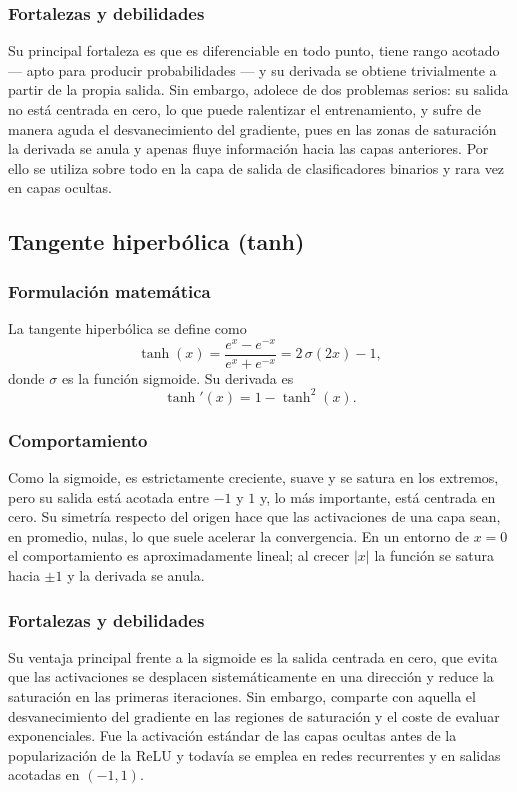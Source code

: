 \documentclass[12pt,a4paper]{article}
\begin{document}
\subsubsection{Fortalezas y debilidades}
Su principal fortaleza es que es diferenciable en todo punto, tiene rango acotado --- apto para producir probabilidades --- y su derivada se obtiene trivialmente a partir de la propia salida. Sin embargo, adolece de dos problemas serios: su salida no está centrada en cero, lo que puede ralentizar el entrenamiento, y sufre de manera aguda el desvanecimiento del gradiente, pues en las zonas de saturación la derivada se anula y apenas fluye información hacia las capas anteriores. Por ello se utiliza sobre todo en la capa de salida de clasificadores binarios y rara vez en capas ocultas.

\subsection{Tangente hiperbólica (tanh)}

\subsubsection{Formulación matemática}
La tangente hiperbólica se define como
\begin{equation*}
\tanh(x) = \frac{e^{x} - e^{-x}}{e^{x} + e^{-x}} = 2\,\sigma(2x) - 1,
\end{equation*}
donde $\sigma$ es la función sigmoide. Su derivada es
\begin{equation*}
\tanh'(x) = 1 - \tanh^2(x).
\end{equation*}

\subsubsection{Comportamiento}
Como la sigmoide, es estrictamente creciente, suave y se satura en los extremos, pero su salida está acotada entre $-1$ y $1$ y, lo más importante, está centrada en cero. Su simetría respecto del origen hace que las activaciones de una capa sean, en promedio, nulas, lo que suele acelerar la convergencia. En un entorno de $x = 0$ el comportamiento es aproximadamente lineal; al crecer $|x|$ la función se satura hacia $\pm 1$ y la derivada se anula.

\subsubsection{Fortalezas y debilidades}
Su ventaja principal frente a la sigmoide es la salida centrada en cero, que evita que las activaciones se desplacen sistemáticamente en una dirección y reduce la saturación en las primeras iteraciones. Sin embargo, comparte con aquella el desvanecimiento del gradiente en las regiones de saturación y el coste de evaluar exponenciales. Fue la activación estándar de las capas ocultas antes de la popularización de la ReLU y todavía se emplea en redes recurrentes y en salidas acotadas en $(-1, 1)$.
\end{document}
